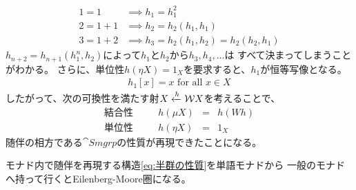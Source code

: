{\begin{equation*}
\begin{split}
		1 = 1 &\implies h_1 = h_1^2 \\
		2 = 1 + 1 &\implies h_2 = h_2(h_1,h_1) \\
		3 = 1 + 2 &\implies h_3 = h_2(h_1,h_2) = h_2(h_2,h_1)
	\end{split}\end{equation*}
	$h_{n+2}=h_{n+1}(h_1^n,h_2)$によって$h_1$と$h_2$から$h_3,h_4,\dots$は
	すべて決まってしまうことがわかる。
	さらに、単位性$h(\eta X)=1_X$を要求すると、$h_1$が恒等写像となる。
	\begin{equation*}\begin{split}
		h_1[x] = x \text{ for all }x\in X
	\end{split}\end{equation*}
	したがって、次の可換性を満たす射$X\xleftarrow[{}]{h}\mathcal{W} X$を考えることで、
	\begin{equation}\label{eq:半群の性質}\begin{array}{lcrcl}
		\text{結合性} &\quad& h(\mu X) &=& h(Wh) \\
		\text{単位性} &\quad& h(\eta X) &=& 1_X
	\end{array}\end{equation}
	随伴の相方である$\cat{Smgrp}$の性質が再現できたことになる。

	モナド内で随伴を再現する構造\eqref{eq:半群の性質}を単語モナドから
	一般のモナドへ持って行くとEilenberg-Moore圏になる。
}
